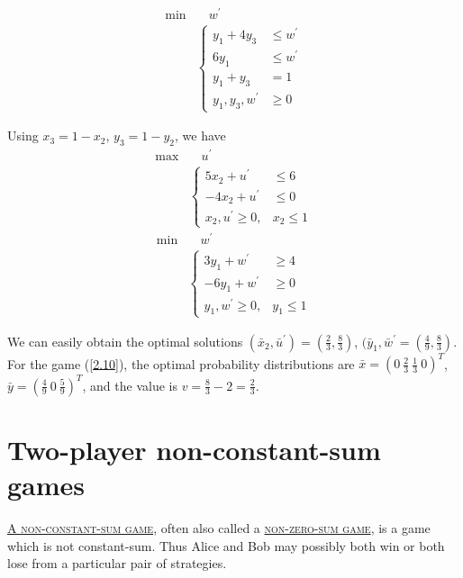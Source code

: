 \begin{example}
    \begin{align*}
        \min & \quad w^{\prime} \\
        & \left\lbrace\begin{array}{rl}
            y_1+4y_3 &\leqslant w^{\prime} \\
            6y_1 & \leqslant w^{\prime} \\
            y_1 + y_3 & = 1\\
            y_1, y_3, w^{\prime} & \geqslant 0
        \end{array} \right. 
    \end{align*}
\end{example}

Using $x_3 = 1-x_2$, $y_3 = 1-y_2$, we have
\begin{align*}
    \max & \quad u^{\prime} \\
    & \left\lbrace\begin{array}{rl}
        5x_2+u^{\prime} &\leqslant 6 \\
        -4x_2+u^{\prime} &\leqslant 0 \\
        x_2, u^{\prime}\geqslant 0, &x_2\leqslant 1
    \end{array} \right.
\end{align*}
\begin{align*}
    \min & \quad w^{\prime} \\
    & \left\lbrace\begin{array}{rl}
        3y_1 + w^{\prime} &\geqslant 4  \\
        -6y_1 + w^{\prime} &\geqslant 0 \\
        y_1, w^{\prime} \geqslant 0, &y_1\leqslant 1
    \end{array} \right.
\end{align*}

We can easily obtain the optimal solutions $(\bar{x}_2, \bar{u}^{\prime}) = (\frac{2}{3}, \frac{8}{3})$, $(\bar{y}_1, \bar{w}^{\prime} = (\frac{4}{9}, \frac{8}{3})$. For the game (\ref{2.10}), the optimal probability distributions are $\bar{x} = \left(0 \ \frac{2}{3} \  \frac{1}{3} \ 0 \right)^T$, $\bar{y} = \left(\frac{4}{9}\ 0 \ \frac{5}{9}\right)^T$, and the value is $v = \frac{8}{3} - 2 = \frac{2}{3}$.

\section{Two-player non-constant-sum games}
\uline{\textcolor{MarkerColour}{\textsc{A non-constant-sum game}}}, often also called a \uline{\textcolor{MarkerColour}{\textsc{non-zero-sum game}}}, is a game which is not constant-sum. Thus Alice and Bob may possibly both win or both lose from a particular pair of strategies. 


